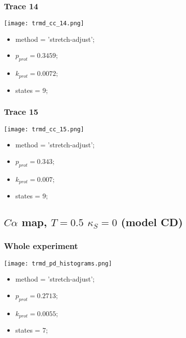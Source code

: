 \subsubsection{Trace 14}
\begin{minipage}[c]{0.7\textwidth}
	\texttt{[image: trmd\_cc\_14.png]}
\end{minipage}
\hfill
\begin{minipage}[c]{0.45\textwidth}
	\begin{itemize}
		\item method = 'stretch-adjust';
		\item $p_{prot}=0.3459$;
		\item $k_{prot}=0.0072$;
		\item states = 9;
	\end{itemize}
\end{minipage}

\subsubsection{Trace 15}
\begin{minipage}[c]{0.7\textwidth}
	\texttt{[image: trmd\_cc\_15.png]}
\end{minipage}
\hfill
\begin{minipage}[c]{0.45\textwidth}
	\begin{itemize}
		\item method = 'stretch-adjust';
		\item $p_{prot}=0.343$;
		\item $k_{prot}=0.007$;
		\item states = 9;
	\end{itemize}
\end{minipage}


\subsection{$C\alpha$ map, $T=0.5$ $\kappa_S=0$ (model CD)}
\subsubsection{Whole experiment}
\begin{minipage}[c]{0.7\textwidth}
    \texttt{[image: trmd\_pd\_histograms.png]}
\end{minipage}
\hfill
\begin{minipage}[c]{0.45\textwidth}
    \begin{itemize}
        \item method = 'stretch-adjust';
        \item $p_{prot}=0.2713$;
        \item $k_{prot}=0.0055$;
        \item states = 7;
    \end{itemize}
\end{minipage}

